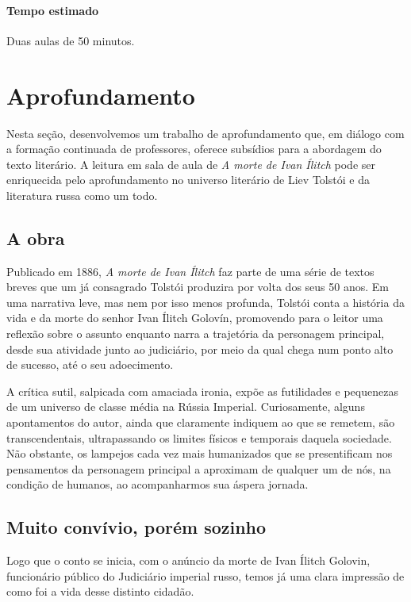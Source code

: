 \documentclass[12pt]{extarticle}
\begin{document}
\paragraph{Tempo estimado} Duas aulas de 50 minutos.


\section{Aprofundamento}

Nesta seção, desenvolvemos um trabalho de aprofundamento que, em diálogo
com a formação continuada de professores, oferece subsídios para a
abordagem do texto literário. A leitura em sala de aula de \emph{A morte
de Ivan Ílitch} pode ser enriquecida pelo aprofundamento no universo
literário de Liev Tolstói e da literatura russa como um todo.

\subsection{A obra}

Publicado em 1886, \emph{A morte de Ivan Ílitch} faz parte de uma série
de textos breves que um já consagrado Tolstói produzira por volta dos
seus 50 anos. Em uma narrativa leve, mas nem por isso
menos profunda, Tolstói conta a história da vida e da morte do senhor
Ivan Ílitch Golovín, promovendo para o leitor uma reflexão sobre o 
assunto enquanto narra a trajetória da personagem
principal, desde sua atividade junto ao judiciário, por meio da qual chega
num ponto alto de sucesso, até o seu adoecimento.




A crítica sutil, salpicada com amaciada ironia, expõe as futilidades e
pequenezas de um universo de classe média na Rússia Imperial.
Curiosamente, alguns apontamentos do autor, ainda que claramente
indiquem ao que se remetem, são transcendentais, ultrapassando os limites
físicos e temporais daquela sociedade. Não obstante, os lampejos cada
vez mais humanizados que se presentificam nos pensamentos da personagem
principal a aproximam de qualquer um de nós, na condição de humanos, ao
acompanharmos sua áspera jornada.

\subsection{Muito convívio, porém sozinho}

Logo que o conto se inicia, com o anúncio da morte de Ivan Ílitch
Golovin, funcionário público do Judiciário imperial russo, temos já
uma clara impressão de como foi a vida desse distinto cidadão.
\end{document}
